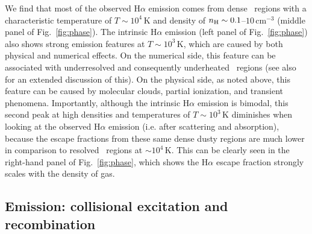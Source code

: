 \documentclass[fleqn,usenatbib]{mnras}
\newcommand\HII{\ion{H}{II}~} %
\begin{document}
We find that most of the observed H$\alpha$ emission comes from dense \HII regions with a characteristic temperature of $T\sim10^4\,\mathrm{K}$ and density of $n_{\rm H}\sim0.1$--$10\,\mathrm{cm}^{-3}$ (middle panel of Fig.~\ref{fig:phase}). The intrinsic H$\alpha$ emission (left panel of Fig.~\ref{fig:phase}) also shows strong emission features at $T\sim10^3\,\mathrm{K}$, which are caused by both physical and numerical effects. On the numerical side, this feature can be associated with underresolved and consequently underheated \HII regions (see also \citealt{smith21_rt} for an extended discussion of this). On the physical side, as noted above, this feature can be caused by molecular clouds, partial ionization, and transient phenomena. Importantly, although the intrinsic H$\alpha$ emission is bimodal, this second peak at high densities and temperatures of $T\sim10^3\,\mathrm{K}$ diminishes when looking at the observed H$\alpha$ emission (i.e. after scattering and absorption), because the escape fractions from these same dense dusty regions are much lower in comparison to resolved \HII regions at $\sim 10^4\,\mathrm{K}$. This can be clearly seen in the right-hand panel of Fig.~\ref{fig:phase}, which shows the H$\alpha$ escape fraction strongly scales with the density of gas. 


\subsection{Emission: collisional excitation and recombination}
\label{subsec:fcol}
\end{document}
